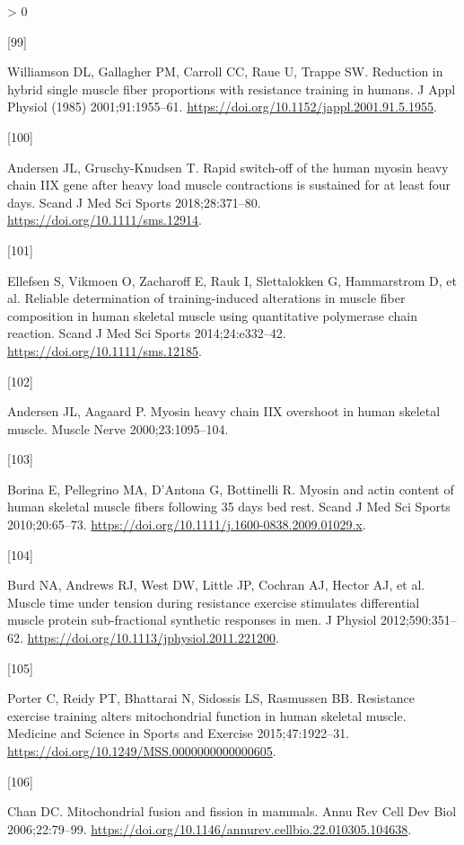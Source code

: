 \documentclass[twoside,10pt]{gihclass} %
\newlength{\cslhangindent}
\newlength{\csllabelwidth}
\newenvironment{CSLReferences}[3] %
 {%
  \setlength{\parindent}{0pt}
  \ifodd #1 \everypar{\setlength{\hangindent}{\cslhangindent}}\ignorespaces\fi
  \ifnum #2 > 0
  \setlength{\parskip}{#2\baselineskip}
  \fi
 }%
 {}
\newcommand{\CSLLeftMargin}[1]{\parbox[t]{\maxof{\widthof{#1}}{\csllabelwidth}}{#1}}
\newcommand{\CSLRightInline}[1]{\parbox[t]{\linewidth}{#1}}
\begin{document}
\begin{CSLReferences}{0}{0}
\leavevmode\hypertarget{ref-RN2799}{}%
\CSLLeftMargin{{[}99{]} }
\CSLRightInline{Williamson DL, Gallagher PM, Carroll CC, Raue U, Trappe SW. Reduction in hybrid single muscle fiber proportions with resistance training in humans. J Appl Physiol (1985) 2001;91:1955--61. \url{https://doi.org/10.1152/jappl.2001.91.5.1955}.}

\leavevmode\hypertarget{ref-RN2056}{}%
\CSLLeftMargin{{[}100{]} }
\CSLRightInline{Andersen JL, Gruschy-Knudsen T. Rapid switch-off of the human myosin heavy chain IIX gene after heavy load muscle contractions is sustained for at least four days. Scand J Med Sci Sports 2018;28:371--80. \url{https://doi.org/10.1111/sms.12914}.}

\leavevmode\hypertarget{ref-RN1489}{}%
\CSLLeftMargin{{[}101{]} }
\CSLRightInline{Ellefsen S, Vikmoen O, Zacharoff E, Rauk I, Slettalokken G, Hammarstrom D, et al. Reliable determination of training-induced alterations in muscle fiber composition in human skeletal muscle using quantitative polymerase chain reaction. Scand J Med Sci Sports 2014;24:e332--42. \url{https://doi.org/10.1111/sms.12185}.}

\leavevmode\hypertarget{ref-RN2057}{}%
\CSLLeftMargin{{[}102{]} }
\CSLRightInline{Andersen JL, Aagaard P. Myosin heavy chain IIX overshoot in human skeletal muscle. Muscle Nerve 2000;23:1095--104.}

\leavevmode\hypertarget{ref-RN2108}{}%
\CSLLeftMargin{{[}103{]} }
\CSLRightInline{Borina E, Pellegrino MA, D'Antona G, Bottinelli R. Myosin and actin content of human skeletal muscle fibers following 35 days bed rest. Scand J Med Sci Sports 2010;20:65--73. \url{https://doi.org/10.1111/j.1600-0838.2009.01029.x}.}

\leavevmode\hypertarget{ref-RN1505}{}%
\CSLLeftMargin{{[}104{]} }
\CSLRightInline{Burd NA, Andrews RJ, West DW, Little JP, Cochran AJ, Hector AJ, et al. Muscle time under tension during resistance exercise stimulates differential muscle protein sub-fractional synthetic responses in men. J Physiol 2012;590:351--62. \url{https://doi.org/10.1113/jphysiol.2011.221200}.}

\leavevmode\hypertarget{ref-RN2608}{}%
\CSLLeftMargin{{[}105{]} }
\CSLRightInline{Porter C, Reidy PT, Bhattarai N, Sidossis LS, Rasmussen BB. Resistance exercise training alters mitochondrial function in human skeletal muscle. Medicine and Science in Sports and Exercise 2015;47:1922--31. \url{https://doi.org/10.1249/MSS.0000000000000605}.}

\leavevmode\hypertarget{ref-RN2817}{}%
\CSLLeftMargin{{[}106{]} }
\CSLRightInline{Chan DC. Mitochondrial fusion and fission in mammals. Annu Rev Cell Dev Biol 2006;22:79--99. \url{https://doi.org/10.1146/annurev.cellbio.22.010305.104638}.}


\end{CSLReferences}
\end{document}

